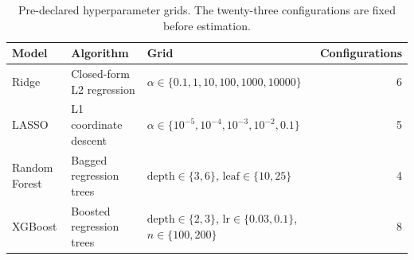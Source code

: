 \begin{table}[H]
\centering
\small
\begin{tabular}{p{2.2cm}p{4.1cm}p{6.2cm}r}
\toprule
Model & Algorithm & Grid & Configurations \\
\midrule
Ridge & Closed-form L2 regression & $\alpha\in\{0.1,1,10,100,1000,10000\}$ & 6 \\
LASSO & L1 coordinate descent & $\alpha\in\{10^{-5},10^{-4},10^{-3},10^{-2},0.1\}$ & 5 \\
Random Forest & Bagged regression trees & $\text{depth}\in\{3,6\}$, $\text{leaf}\in\{10,25\}$ & 4 \\
XGBoost & Boosted regression trees & $\text{depth}\in\{2,3\}$, $\text{lr}\in\{0.03,0.1\}$, $n\in\{100,200\}$ & 8 \\
\bottomrule
\end{tabular}
\caption{Pre-declared hyperparameter grids. The twenty-three configurations are fixed before estimation.}
\label{tab:grid}
\end{table}
